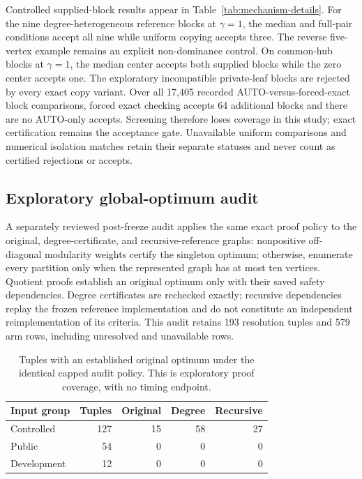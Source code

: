 \documentclass[sigconf,anonymous,review]{acmart}
\newcommand{\1}{\mathbf{1}}
\begin{document}
Controlled supplied-block results appear in Table~\ref{tab:mechanism-details}.
For the nine degree-heterogeneous reference blocks at $\gamma=1$, the median
and full-pair conditions accept all nine while uniform copying accepts three.
The reverse five-vertex example remains an explicit non-dominance control.
On common-hub blocks at $\gamma=1$, the median center accepts both supplied
blocks while the zero center accepts one. The exploratory incompatible private-leaf
blocks are rejected by every exact copy variant. Over all 17,405 recorded
AUTO-versus-forced-exact block comparisons, forced exact checking accepts 64
additional blocks and there are no AUTO-only accepts. Screening therefore
loses coverage in this study; exact certification remains the acceptance gate.
Unavailable uniform comparisons and numerical isolation matches retain
their separate statuses and never count as certified rejections or accepts.

\subsection{Exploratory global-optimum audit}
A separately reviewed post-freeze audit applies the same exact proof policy to
the original, degree-certificate, and recursive-reference graphs: nonpositive
off-diagonal modularity weights certify the singleton optimum; otherwise,
enumerate every partition only when the represented graph has at most ten
vertices. Quotient proofs establish an original optimum only with their saved
safety dependencies. Degree certificates are rechecked exactly; recursive
dependencies replay the frozen reference implementation and do not constitute
an independent reimplementation of its criteria. This audit retains 193
resolution tuples and 579 arm rows, including unresolved and unavailable rows.

\begin{table}[t]
\caption{Tuples with an established original optimum under the identical capped
audit policy. This is exploratory proof coverage, with no timing endpoint.}
\label{tab:global-audit}
\centering
\begin{tabular}{lrrrr}\toprule
Input group & Tuples & Original & Degree & Recursive\\\midrule
Controlled &127&15&58&27\\
Public &54&0&0&0\\
Development &12&0&0&0\\\bottomrule
\end{tabular}
\end{table}
\end{document}
